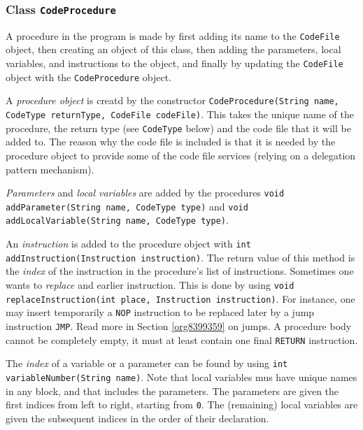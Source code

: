 \documentclass[11pt]{article}
\begin{document}

\subsubsection{Class \texttt{CodeProcedure}}
\label{sec:org049fb84}

A procedure in the program is made by first adding its name to the
\texttt{CodeFile} object, then creating an object of this class, then adding the
parameters, local variables, and instructions to the object, and finally by
updating the \texttt{CodeFile} object with the \texttt{CodeProcedure} object.

A \emph{procedure object} is creatd by the constructor \texttt{CodeProcedure(String
name, CodeType returnType, CodeFile codeFile)}. This takes the unique name
of the procedure, the return type (see \texttt{CodeType} below) and the code file
that it will be added to. The reason why the code file is included is that
it is needed by the procedure object to provide some of the code file
services (relying on a delegation pattern mechanism).



\emph{Parameters} and \emph{local variables} are added by the procedures \texttt{void
addParameter(String name, CodeType type)} and  \texttt{void addLocalVariable(String
name, CodeType type)}.


An \emph{instruction} is added to the procedure object with \texttt{int
addInstruction(Instruction instruction)}. The return value of this method
is the \emph{index} of the instruction in the procedure's list of
instructions. Sometimes one wants to \emph{replace} and earlier
instruction. This is done by using \texttt{void replaceInstruction(int place,
Instruction instruction)}. For instance, one may insert temporarily a \texttt{NOP}
instruction to be replaced later by a jump instruction \texttt{JMP}. Read more in
Section  \ref{org8399359} on jumps. A procedure body cannot be
completely empty, it must at least contain one final \texttt{RETURN}
instruction.



The \emph{index} of a variable or a parameter can be found by using \texttt{int
variableNumber(String name)}. Note that local variables mus have unique
names in any block, and that includes the parameters. The parameters are
given the first indices from left to right, starting from \texttt{0}. The
(remaining) local variables are given the subsequent indices in the order
of their declaration.
\end{document}
